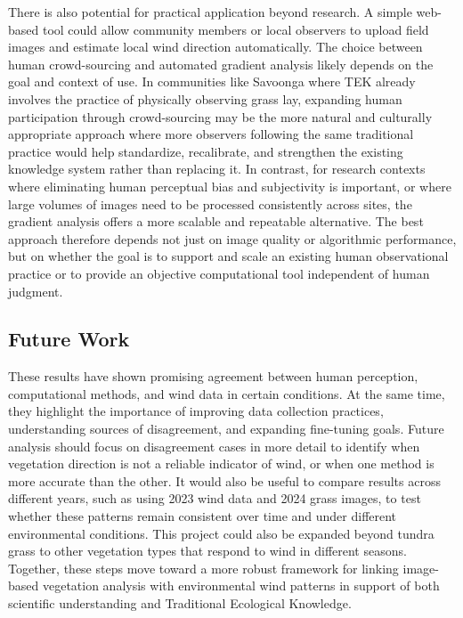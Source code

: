 \documentclass[
]{article}
\begin{document}
There is also potential for practical application beyond research. A
simple web-based tool could allow community members or local observers
to upload field images and estimate local wind direction automatically.
The choice between human crowd-sourcing and automated gradient analysis
likely depends on the goal and context of use. In communities like
Savoonga where TEK already involves the practice of physically observing
grass lay, expanding human participation through crowd-sourcing may be
the more natural and culturally appropriate approach where more
observers following the same traditional practice would help
standardize, recalibrate, and strengthen the existing knowledge system
rather than replacing it. In contrast, for research contexts where
eliminating human perceptual bias and subjectivity is important, or
where large volumes of images need to be processed consistently across
sites, the gradient analysis offers a more scalable and repeatable
alternative. The best approach therefore depends not just on image
quality or algorithmic performance, but on whether the goal is to
support and scale an existing human observational practice or to provide
an objective computational tool independent of human judgment.

\subsection{Future Work}\label{future-work}

These results have shown promising agreement between human perception,
computational methods, and wind data in certain conditions. At the same
time, they highlight the importance of improving data collection
practices, understanding sources of disagreement, and expanding
fine-tuning goals. Future analysis should focus on disagreement cases in
more detail to identify when vegetation direction is not a reliable
indicator of wind, or when one method is more accurate than the other.
It would also be useful to compare results across different years, such
as using 2023 wind data and 2024 grass images, to test whether these
patterns remain consistent over time and under different environmental
conditions. This project could also be expanded beyond tundra grass to
other vegetation types that respond to wind in different seasons.
Together, these steps move toward a more robust framework for linking
image-based vegetation analysis with environmental wind patterns in
support of both scientific understanding and Traditional Ecological
Knowledge.
\end{document}

